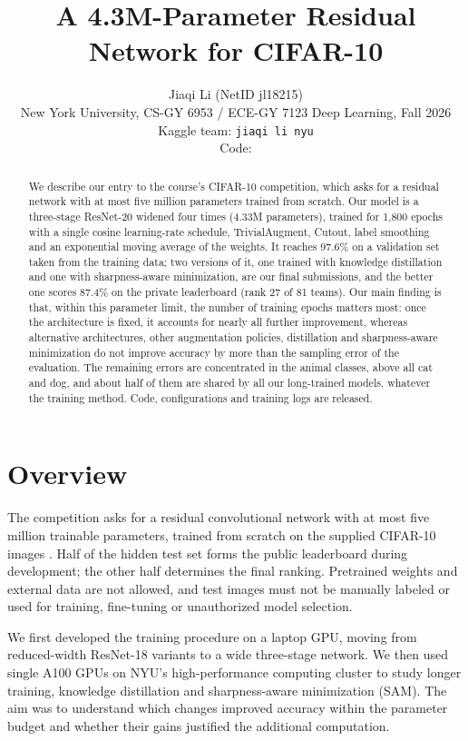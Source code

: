 \documentclass[letterpaper]{article}
\title{A 4.3M-Parameter Residual Network for CIFAR-10}
\author{Jiaqi Li (NetID jl18215)\\
New York University, CS-GY 6953 / ECE-GY 7123 Deep Learning, Fall 2026\\
Kaggle team: \texttt{jiaqi li nyu}\\
Code: \weblink{https://github.com/Songard/cifar-10-res-net-architecture-challenge-dl}{\url{https://github.com/Songard/cifar-10-res-net-architecture-challenge-dl}}
}
\begin{document}
\maketitle

\begin{abstract}
We describe our entry to the course's CIFAR-10 competition, which asks for a residual network with at most five million
parameters trained from scratch. Our model is a three-stage ResNet-20 widened four times (4.33M parameters), trained for
1,800 epochs with a single cosine learning-rate schedule, TrivialAugment, Cutout, label smoothing and an exponential moving
average of the weights. It reaches 97.6\% on a validation set taken from the training data; two versions of it, one trained with knowledge
distillation and one with sharpness-aware minimization, are our final submissions, and the better one scores 87.4\% on the
private leaderboard (rank 27 of 81 teams). Our main finding is that, within this parameter limit, the number of training epochs matters most: once
the architecture is fixed, it accounts for nearly all further improvement, whereas alternative architectures, other
augmentation policies, distillation and sharpness-aware minimization do not improve accuracy by more than the sampling error
of the evaluation. The remaining errors are concentrated in the animal classes, above all cat and dog, and about half of them are shared by all our long-trained models, whatever the training method. Code, configurations and
training logs are released.
\end{abstract}

\section{Overview}
The competition asks for a residual convolutional network with at most five million trainable parameters, trained from
scratch on the supplied CIFAR-10 images \cite{krizhevsky2009learning,kaggle2026competition}. Half of the hidden test set
forms the public leaderboard during development; the other half determines the final ranking. Pretrained weights and
external data are not allowed, and test images must not be manually labeled or used for training, fine-tuning or
unauthorized model selection.

We first developed the training procedure on a laptop GPU, moving from reduced-width ResNet-18 variants to a wide
three-stage network. We then used single A100 GPUs on NYU's high-performance computing cluster to study longer training,
knowledge distillation and sharpness-aware minimization (SAM). The aim was to understand which changes improved accuracy
within the parameter budget and whether their gains justified the additional computation.
\end{document}
